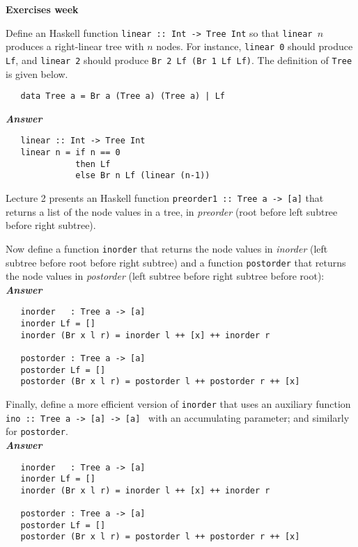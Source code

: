 \documentclass[a4paper]{article}
\begin{document}
\begin{center}
{\Large\bf Exercises week }\\[1ex]
\end{center}


\begin{exercise}\label{exer-right-linear}
  Define an Haskell function \texttt{linear ::\ Int -> Tree Int} so that
  \texttt{linear $n$} produces a right-linear tree with $n$ nodes.
  For instance, \texttt{linear 0} should produce \texttt{Lf}, and
  \texttt{linear 2} should produce \texttt{Br 2 Lf (Br 1 Lf Lf)}.  The definition
  of \texttt{Tree} is given below.
{\codesetup\begin{verbatim}
   data Tree a = Br a (Tree a) (Tree a) | Lf
\end{verbatim}}
\noindent
\textbf{\emph{Answer}}
{\codesetup\begin{verbatim}
   linear :: Int -> Tree Int
   linear n = if n == 0
              then Lf 
              else Br n Lf (linear (n-1))
\end{verbatim}}

\end{exercise}


\begin{exercise}\label{exer-tree-traversal}
  Lecture 2 presents an Haskell function \texttt{preorder1 ::\ Tree a ->
    [a]} that returns a list of the node values in a tree, in
  \emph{preorder} (root before left subtree before right subtree).
  
  Now define a function \texttt{inorder} that returns the node values
  in \emph{inorder} (left subtree before root before right subtree)
  and a function \texttt{postorder} that returns the node values in
  \emph{postorder} (left subtree before right subtree before root):\\
  
\noindent
\textbf{\emph{Answer}}
{\codesetup\begin{verbatim}
   inorder   : Tree a -> [a]
   inorder Lf = []
   inorder (Br x l r) = inorder l ++ [x] ++ inorder r
   
   postorder : Tree a -> [a]
   postorder Lf = []
   postorder (Br x l r) = postorder l ++ postorder r ++ [x]
\end{verbatim}}

\noindent 
Finally, define a more efficient version of \texttt{inorder} that
  uses an auxiliary function \texttt{ino ::\ Tree a -> [a] -> [a]
    } with an accumulating parameter; and similarly for
  \texttt{postorder}.  \\
  
  \noindent
\textbf{\emph{Answer}}
{\codesetup\begin{verbatim}
   inorder   : Tree a -> [a]
   inorder Lf = []
   inorder (Br x l r) = inorder l ++ [x] ++ inorder r
   
   postorder : Tree a -> [a]
   postorder Lf = []
   postorder (Br x l r) = postorder l ++ postorder r ++ [x]
\end{verbatim}}
\end{exercise}
\end{document}
